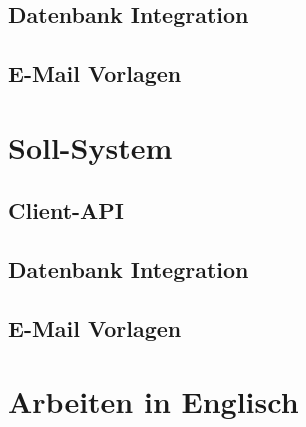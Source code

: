 \subsection{Datenbank Integration}
\subsection{E-Mail Vorlagen}
\section{Soll-System}
\subsection{Client-API}
\subsection{Datenbank Integration}
\subsection{E-Mail Vorlagen}

\section{Arbeiten in Englisch}
\label{sec:englisch}
